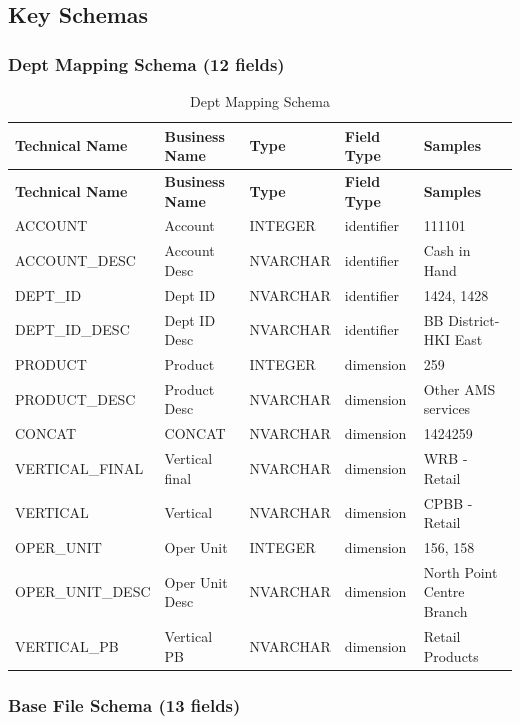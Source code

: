 \documentclass[11pt,a4paper]{article}
\begin{document}
\subsection{Key Schemas}

\subsubsection{Dept Mapping Schema (12 fields)}

\begin{longtable}{@{}L{3cm}L{2.5cm}C{2cm}C{2cm}L{4cm}@{}}
\caption{Dept Mapping Schema} \\
\toprule
\textbf{Technical Name} & \textbf{Business Name} & \textbf{Type} & \textbf{Field Type} & \textbf{Samples} \\
\midrule
\endfirsthead
\toprule
\textbf{Technical Name} & \textbf{Business Name} & \textbf{Type} & \textbf{Field Type} & \textbf{Samples} \\
\midrule
\endhead
ACCOUNT & Account & INTEGER & identifier & 111101 \\
ACCOUNT\_DESC & Account Desc & NVARCHAR & identifier & Cash in Hand \\
DEPT\_ID & Dept ID & NVARCHAR & identifier & 1424, 1428 \\
DEPT\_ID\_DESC & Dept ID Desc & NVARCHAR & identifier & BB District-HKI East \\
PRODUCT & Product & INTEGER & dimension & 259 \\
PRODUCT\_DESC & Product Desc & NVARCHAR & dimension & Other AMS services \\
CONCAT & CONCAT & NVARCHAR & dimension & 1424259 \\
VERTICAL\_FINAL & Vertical final & NVARCHAR & dimension & WRB - Retail \\
VERTICAL & Vertical & NVARCHAR & dimension & CPBB - Retail \\
OPER\_UNIT & Oper Unit & INTEGER & dimension & 156, 158 \\
OPER\_UNIT\_DESC & Oper Unit Desc & NVARCHAR & dimension & North Point Centre Branch \\
VERTICAL\_PB & Vertical PB & NVARCHAR & dimension & Retail Products \\
\bottomrule
\end{longtable}

\subsubsection{Base File Schema (13 fields)}
\end{document}
